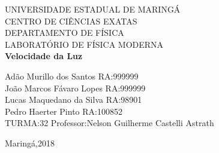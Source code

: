 \documentclass[a4paper,10pt]{report}
\begin{document}
	

\begin{titlepage}
\begin{center}
{\large UNIVERSIDADE ESTADUAL DE MARINGÁ}\\[0.2cm]
{\large CENTRO DE CIÊNCIAS EXATAS}\\[0.2cm]
{\large DEPARTAMENTO DE FÍSICA}\\[0.2cm]
{\large LABORATÓRIO DE FÍSICA MODERNA}\\[7.0cm]
{\bf \huge Velocidade da Luz}\\[7.0cm]
\end{center}
{\large Adão Murillo dos Santos \hfill RA:999999}\\[0.7cm]
{\large João Marcos Fávaro Lopes \hfill RA:999999}\\[0.7cm]
{\large Lucas Maquedano da Silva \hfill RA:98901}\\[0.7cm]
{\large Pedro Haerter Pinto \hfill RA:100852}\\[0.7cm]
{\large TURMA:32 \hfill Professor:Nelson Guilherme Castelli
Astrath}\\[1.0cm]
\begin{center}
{\large Maringá,2018}\\[0.2cm]
\end{center}
\end{titlepage}
\end{document}
